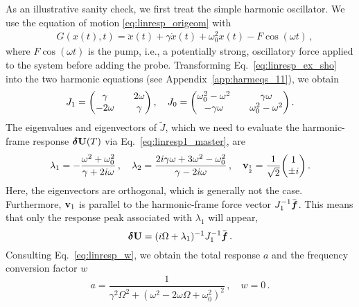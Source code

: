 As an illustrative sanity check, we first treat the simple harmonic oscillator. We use the equation of motion \eqref{eq:linresp_origeom} with 
\begin{equation} \label{eq:linresp_ex_sho}
\begin{gathered}
\quad G(x(t), t) =  \ddot{x}(t) + \gamma \dot{x}(t) + \omega_0^2 x(t) - F \cos(\omega t) \,,
\end{gathered}
\end{equation}
where $F \cos(\omega t)$ is the pump, i.e., a potentially strong, oscillatory force applied to the system before adding the probe. 
Transforming Eq.~\eqref{eq:linresp_ex_sho} into the two harmonic equations (see Appendix~\ref{app:harmeqs_11}), we obtain
\begin{equation}
J_1 = \mqty(\gamma && 2 \omega \\ -2 \omega && \gamma ) \,,\quad
J_0 = \mqty( \omega_0^2 - \omega^2 && \gamma \omega \\ -\gamma \omega && \omega_0^2 - \omega^2) \,.
\end{equation}
The eigenvalues and eigenvectors of $\tilde{J}$, which we need to evaluate the harmonic-frame response $\boldsymbol{\delta} \vb{U}(T)$ via Eq.~\eqref{eq:linresp1_master}, are
\begin{equation}
\lambda_1 =  -\frac{\omega^2 + \omega_0^2}{\gamma + 2 i \omega}\,,\quad \lambda_2 = \frac{2 i \gamma \omega + 
3\omega^2 - \omega_0^2}{\gamma - 2 i \omega}   \,, \quad  \vb{v}_{_{2}^{1}} = \frac{1}{\sqrt{2}}\mqty(1 \\ \pm i) \,.
\end{equation}
Here, the eigenvectors are orthogonal, which is generally not the case. Furthermore, $\vb{v}_1$ is parallel to the harmonic-frame force vector $J_1^{-1} \bar{\boldsymbol{f}}$. This means that only the response peak associated with $\lambda_1$ will appear,
\begin{equation}
\boldsymbol{\delta} \vb{U} = (i \Omega + \lambda_1)^{-1} J_1^{-1} \bar{\boldsymbol{f}} \,.
\end{equation}
Consulting Eq.~\eqref{eq:linresp_w}, we obtain the total response $a$ and the frequency conversion factor $w$
\begin{equation}
a = \frac{1}{\gamma^2 \Omega^2 +  \left( \omega^2 - 2 \omega \Omega + \omega_0^2 \right)^2} \,, \quad w = 0 \,.
\end{equation}

